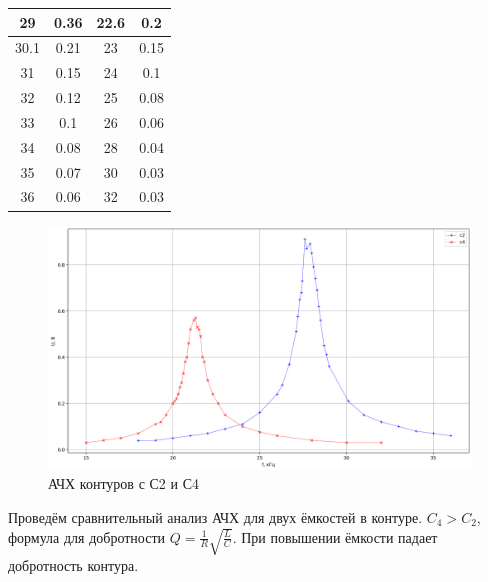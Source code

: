 \documentclass[a4paper]{article}
\begin{document}
\begin{enumerate}
\begin{table}[h]
\begin{tabular}{|c|c|c|c|}
                  29                          & 0.36                       & 22.6     & 0.2    \\ \hline
                  30.1                        & 0.21                       & 23       & 0.15   \\ \hline
                  31                          & 0.15                       & 24       & 0.1    \\ \hline
                  32                          & 0.12                       & 25       & 0.08   \\ \hline
                  33                          & 0.1                        & 26       & 0.06   \\ \hline
                  34                          & 0.08                       & 28       & 0.04   \\ \hline
                  35                          & 0.07                       & 30       & 0.03   \\ \hline
                  36                          & 0.06                       & 32       & 0.03   \\ \hline

              \end{tabular}
          \end{table}

          \begin{figure}[H]
              \centering
              \includegraphics[width=\textwidth]{lol.png}
              \caption{АЧХ контуров с С2 и С4}
              \label{fig:vac}
          \end{figure}

          Проведём сравнительный анализ АЧХ для двух ёмкостей в контуре. $C_4 > C_2$, формула для добротности $Q = \frac{1}{R}\sqrt{\frac{L}{C}}$. При повышении ёмкости падает добротность контура.


\end{enumerate}
\end{document}
